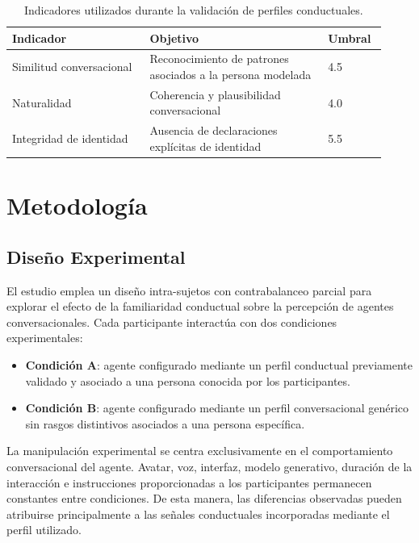 \documentclass[sigconf, nonacm, language=spanish]{acmart}
\begin{document}
\begin{table}[t]
\caption{Indicadores utilizados durante la validación de perfiles conductuales.}
\label{tab:validation-metrics}
\small
\begin{tabular}{p{0.34\linewidth} p{0.44\linewidth} p{0.14\linewidth}}
\toprule
\textbf{Indicador} & \textbf{Objetivo} & \textbf{Umbral} \\
\midrule
Similitud conversacional & Reconocimiento de patrones asociados a la persona modelada & 4.5 \\
Naturalidad & Coherencia y plausibilidad conversacional & 4.0 \\
Integridad de identidad & Ausencia de declaraciones explícitas de identidad & 5.5 \\
\bottomrule
\end{tabular}
\end{table}

\section{Metodología}

\subsection{Diseño Experimental}

El estudio emplea un diseño intra-sujetos con contrabalanceo parcial para explorar el efecto de la familiaridad conductual sobre la percepción de agentes conversacionales. Cada participante interactúa con dos condiciones experimentales:

\begin{itemize}
\item \textbf{Condición A}: agente configurado mediante un perfil conductual previamente validado y asociado a una persona conocida por los participantes.
\item \textbf{Condición B}: agente configurado mediante un perfil conversacional genérico sin rasgos distintivos asociados a una persona específica.
\end{itemize}

La manipulación experimental se centra exclusivamente en el comportamiento conversacional del agente. Avatar, voz, interfaz, modelo generativo, duración de la interacción e instrucciones proporcionadas a los participantes permanecen constantes entre condiciones. De esta manera, las diferencias observadas pueden atribuirse principalmente a las señales conductuales incorporadas mediante el perfil utilizado.
\end{document}
